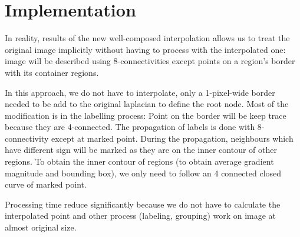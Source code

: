 \documentclass[12pt,a4paper,draft]{article}
\begin{document}
\section{Implementation}
In reality, results of the new well-composed interpolation allows us to treat the original image implicitly without having to process with the interpolated one: image will be described using 8-connectivities except points on a region's border with its container regions.  

In this approach, we do not have to interpolate, only a 1-pixel-wide border needed to be add to the original laplacian to define the root node. Most of the modification is in the labelling process: Point on the border will be keep trace because they are 4-connected. The propagation of labels is done with 8-connectivity except at marked point. During the propagation, neighbours which have different sign will be marked as they are on the inner contour of other regions. To obtain the inner contour of regions (to obtain average gradient magnitude and bounding box), we only need to follow an 4 connected closed curve of marked point. 

Processing time reduce significantly because we do not have to calculate the interpolated point and other process (labeling, grouping) work on image at almost original size.
\end{document}
